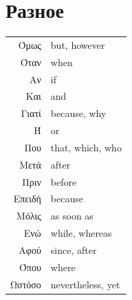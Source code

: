 \documentclass[12pt]{article}
\newcommand{\my}[1]{\textcolor{gray!80!white}{#1}}
\newenvironment{page}{\clearpage\normalsize\null\vfill}{\vfill\null}
\begin{document}
    \begin{page}
        \section{Разное}
        \begin{tabular}{rl}
            Όμως & \my{but, however}\\
            Όταν & \my{when}\\
            Αν & \my{if}\\
            Και & \my{and}\\
            Γιατί & \my{because, why}\\
            Ή & \my{or}\\
            Που & \my{that, which, who}\\
            Μετά & \my{after}\\
            Πριν & \my{before}\\
            Επειδή & \my{because}\\
            Μόλις & \my{as soon as}\\
            Ενώ & \my{while, whereas}\\
            Αφού & \my{since, after}\\
            Όπου & \my{where}\\
            Ωστόσο & \my{nevertheless, yet}\\
        \end{tabular}
    \end{page}
\end{document}
